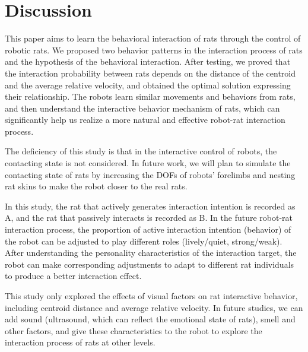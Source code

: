 \section{Discussion}
This paper aims to learn the behavioral interaction of rats through the control
of robotic rats. We proposed two behavior patterns in the interaction process of
rats and the hypothesis of the behavioral interaction. After testing, we proved
that the interaction probability between rats depends on the distance of the
centroid and the average relative velocity, and obtained the optimal solution
expressing their relationship. The robots learn similar movements and behaviors
from rats, and then understand the interactive behavior mechanism of rats, which
can significantly help us realize a more natural and effective robot-rat
interaction process.

The deficiency of this study is that in the interactive control of robots, the
contacting state is not considered. In future work, we will plan to simulate the
contacting state of rats by increasing the DOFs of robots' forelimbs and nesting
rat skins to make the robot closer to the real rats.

In this study, the rat that actively generates interaction intention is recorded
as A, and the rat that passively interacts is recorded as B. In the future
robot-rat interaction process, the proportion of active interaction intention
(behavior) of the robot can be adjusted to play different roles (lively/quiet,
strong/weak). After understanding the personality characteristics of the
interaction target, the robot can make corresponding adjustments to adapt to
different rat individuals to produce a better interaction effect.

This study only explored the effects of visual factors on rat interactive
behavior, including centroid distance and average relative velocity. In future
studies, we can add sound (ultrasound, which can reflect the emotional state of
rats), smell and other factors, and give these characteristics to the robot to
explore the interaction process of rats at other levels.
